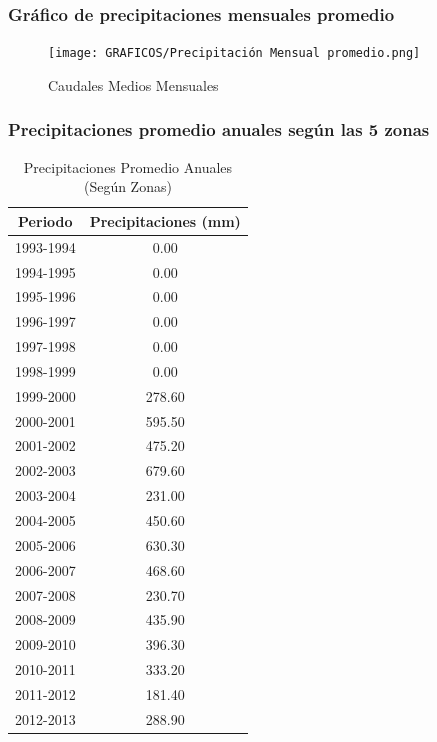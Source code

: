 \documentclass{article} %
\begin{document}
\newpage
\subsubsection{Gráfico de precipitaciones mensuales promedio}
\begin{figure}[h!]
    \centering
    \texttt{[image: GRAFICOS/Precipitación Mensual promedio.png]}
    \caption{Caudales Medios Mensuales}
    \label{fig:caudales_mensuales}
\end{figure}

\newpage

\subsubsection{Precipitaciones promedio anuales según las 5 zonas}

\begin{table}[ht]
    \centering
    \caption{Precipitaciones Promedio Anuales (Según Zonas)}
    \vspace{0.2cm}
    \begin{tabular}{|c|c|}
        \hline
        \textbf{Periodo} & \textbf{Precipitaciones (mm)} \\
        \hline
        1993-1994 & 0.00 \\
        1994-1995 & 0.00 \\
        1995-1996 & 0.00 \\
        1996-1997 & 0.00 \\
        1997-1998 & 0.00 \\
        1998-1999 & 0.00 \\
        1999-2000 & 278.60 \\
        2000-2001 & 595.50 \\
        2001-2002 & 475.20 \\
        2002-2003 & 679.60 \\
        2003-2004 & 231.00 \\
        2004-2005 & 450.60 \\
        2005-2006 & 630.30 \\
        2006-2007 & 468.60 \\
        2007-2008 & 230.70 \\
        2008-2009 & 435.90 \\
        2009-2010 & 396.30 \\
        2010-2011 & 333.20 \\
        2011-2012 & 181.40 \\
        2012-2013 & 288.90 \\

\end{tabular}
\end{table}
\end{document}
